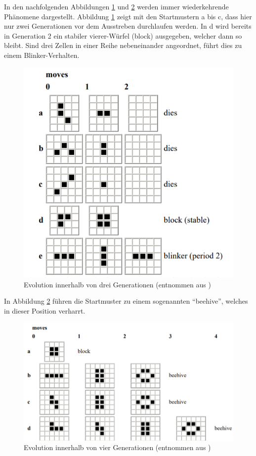 \documentclass[../mciAusarbeitung.tex]{subfiles}
\begin{document}
In den nachfolgenden Abbildungen \ref{moves_1} und \ref{moves_2} werden immer wiederkehrende Phänomene dargestellt. Abbildung \ref{moves_1} zeigt mit den Startmustern a bis c, dass hier nur zwei Generationen vor dem Ausstreben durchlaufen werden. In d wird bereits in Generation 2 ein stabiler vierer-Würfel (block) ausgegeben, welcher dann so bleibt. Sind drei Zellen in einer Reihe nebeneinander angeordnet, führt dies zu einem Blinker-Verhalten.
\begin{figure}[H]
\includegraphics[width=\linewidth]{img/moves_1.png}
\caption{Evolution innerhalb von drei Generationen (entnommen aus \cite{gardner1970mathematical})}
\label{moves_1}
\end{figure}
In Abbildung \ref{moves_2} führen die Startmuster zu einem sogenannten "`beehive"', welches in dieser Position verharrt.
\begin{figure}[H]
\includegraphics[width=\linewidth]{img/moves_2.png}
\caption{Evolution innerhalb von vier Generationen (entnommen aus \cite{gardner1970mathematical})}
\label{moves_2}
\end{figure}
\end{document}
